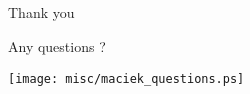 \documentclass[compress,red]{beamer}
\begin{document}
\subsection{}
\begin{frame}{Thank you}

    \begin{center}
    Any questions ?
    \end{center}

    
    \begin{center}
    \texttt{[image: misc/maciek\_questions.ps]}
    \end{center}

\end{frame}
\end{document}
